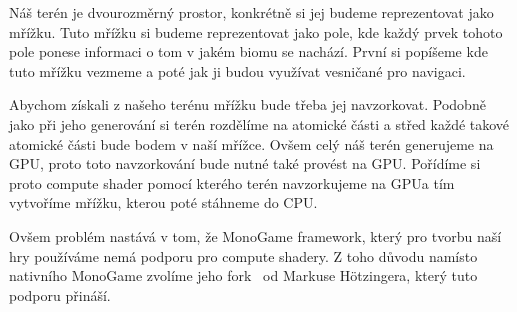 Náš terén je dvourozměrný prostor, konkrétně si jej budeme reprezentovat jako mřížku. Tuto mřížku si budeme reprezentovat jako pole, kde každý prvek tohoto pole ponese informaci o tom v jakém biomu se nachází. První si popíšeme kde tuto mřížku vezmeme a poté jak ji budou využívat vesničané pro navigaci.

Abychom získali z našeho terénu mřížku bude třeba jej navzorkovat. Podobně jako při jeho generování si terén rozdělíme na atomické části a střed každé takové atomické části bude bodem v naší mřížce. Ovšem celý náš terén generujeme na GPU, proto toto navzorkování bude nutné také provést na GPU. Pořídíme si proto compute shader pomocí kterého terén navzorkujeme na GPUa tím vytvoříme mřížku, kterou poté stáhneme do CPU.

Ovšem problém nastává v tom, že MonoGame framework, který pro tvorbu naší hry používáme nemá podporu pro compute shadery. Z toho důvodu namísto nativního MonoGame zvolíme jeho fork~\cite{MonoGameCptMax} od Markuse Hötzingera, který tuto podporu přináší.











